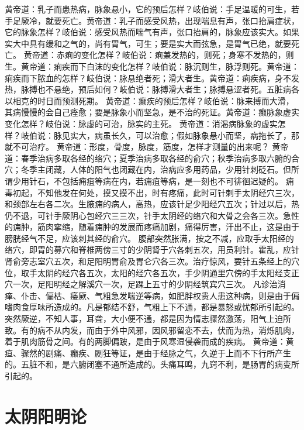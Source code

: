 \documentclass[12pt,UTF8]{ctexbook}
\begin{document}
黄帝道：乳子而患热病，脉象悬小，它的预后怎样？岐伯说：手足温暖的可生，若手足厥冷，就要死亡。黄帝道：乳子而感受风热，出现喘息有声，张口抬肩症状，它的脉象怎样？岐伯说：感受风热而喘气有声，张口抬肩的，脉象应该实大。如果实大中具有缓和之气的，尚有胃气，可生；要是实大而弦急，是胃气已绝，就要死亡。
黄帝道：赤痢的变化怎样？岐伯说：痢兼发热的，则死；身寒不发热的，则生。黄帝道：痢疾而下白沫的变化怎样？岐伯说：脉沉则生，脉浮则死。黄帝道：痢疾而下脓血的怎样？岐伯说：脉悬绝者死；滑大者生。黄帝道：痢疾病，身不发热，脉搏也不悬绝，预后如何？岐伯说：脉搏滑大者生；脉搏悬涩者死。五脏病各以相克的时日而预测死期。
黄帝道：癫疾的预后怎样？岐伯说：脉来搏而大滑，其病慢慢的会自己痊愈；要是脉象小而坚急，是不治的死证。黄帝道：癫脉象虚实变化怎样？岐伯说：脉虚的可治，脉实的主死。
黄帝道：消渴病脉象的虚实怎样？岐伯说：脉见实大，病虽长久，可以治愈；假如脉象悬小而坚，病拖长了，那就不可治疗。
黄帝道：形度，骨度，脉度，筋度，怎样才测量的出来呢？
黄帝道：春季治病多取各经的络穴；夏季治病多取各经的俞穴；秋季治病多取六腑的合穴；冬季主闭藏，人体的阳气也闭藏在内，治病应多用药品，少用针刺砭石。但所谓少用针石，不包括痈疽等病在内，若痈疽等病，是一刻也不可徘徊迟疑的。
痈毒初起，不知他发在何处，摸又摸不出，时有疼痛，此时可针刺手太阴经穴三次，和颈部左右各二次。生腋痈的病人，高热，应该针足少阳经穴五次；针过以后，热仍不退，可针手厥阴心包经穴三三次，针手太阴经的络穴和大骨之会各三次。急性的痈肿，筋肉挛缩，随着痈肿的发展而疼痛加剧，痛得厉害，汗出不止，这是由于膀胱经气不足，应该刺其经的俞穴。
腹部突然胀满，按之不减，应取手太阳经的络穴，即胃的募穴和脊椎两傍三寸的少阴肾于穴各刺五次，用员利针。霍乱，应针肾俞旁志室穴五次，和足阳明胃俞及胃仑穴各三次。治疗惊风，要针五条经上的穴位，取手太阴的经穴各五次，太阳的经穴各五次，手少阴通里穴傍的手太阳经支正穴一次，足阳明经之解溪穴一次，足踝上五寸的少阴经筑宾穴三次。
凡诊治消瘅、仆击、偏枯、痿厥、气粗急发喘逆等病，如肥胖权贵人患这种病，则是由于偏嗜肉食厚味所造成的。凡是郁结不舒，气粗上下不通，都是暴怒或忧郁所引起的。突然厥逆，不知人事，耳聋，大小便不通，都是因为情志骤然激荡，阳气上迫所致。有的病不从内发，而由于外中风邪，因风邪留恋不去，伏而为热，消烁肌肉，着于肌肉筋骨之间。有的两脚偏跛，是由于风寒湿侵袭而成的疾病。
黄帝道：黄疸、骤然的剧痛、癫疾、劂狂等证，是由于经脉之气，久逆于上而不下行所产生的。五脏不和，是六腑闭塞不通所造成的。头痛耳鸣，九窍不利，是肠胃的病变所引起的。

\chapter{太阴阳明论}
\end{document}
